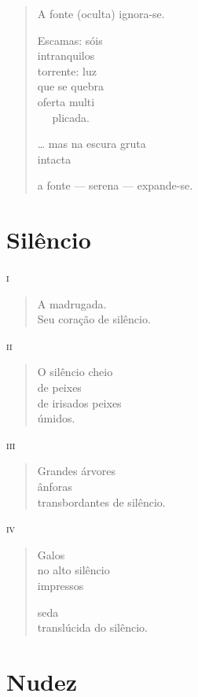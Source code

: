 \begin{verse}
A fonte (oculta) ignora-se.

Escamas: sóis\\
\qquad\qquad\mbox{} intranquilos\\
torrente: luz\\
que se quebra\\
oferta multi\\
\qquad\mbox{ }\mbox{ } plicada.

\ldots{} mas na escura gruta\\
\quad intacta

a fonte --- serena --- expande-se.
\end{verse}

\chapter{Silêncio}

\forceindent\textsc{i}

\begin{verse}
A madrugada.\\
Seu coração de silêncio.
\end{verse}

\medskip
\textsc{ii}

\begin{verse}
O silêncio cheio\\
de peixes\\
de irisados peixes\\
úmidos.
\end{verse}

\medskip
\textsc{iii}

\begin{verse}
Grandes árvores\\
ânforas\\
transbordantes de silêncio.
\end{verse}

\medskip
\textsc{iv}

\begin{verse}
Galos\\
no alto silêncio\\
impressos

seda\\
translúcida do silêncio.
\end{verse}

\chapter{Nudez}


